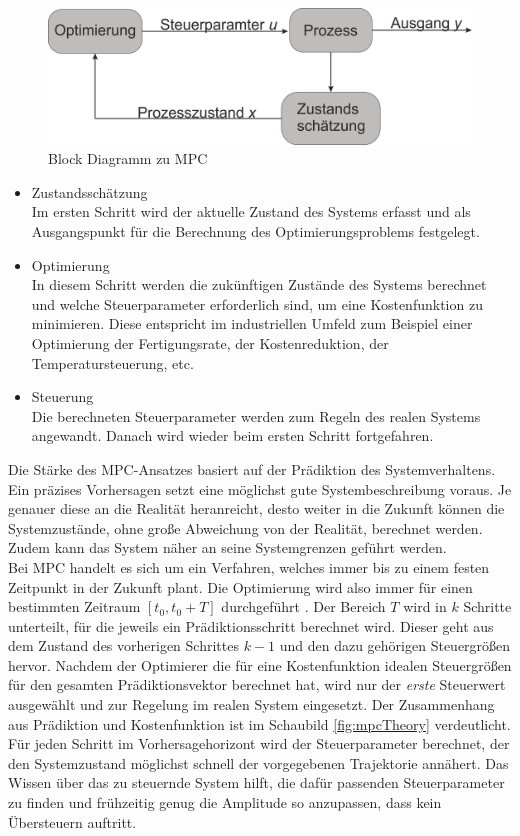 \documentclass{like}
\begin{document}
  \begin{figure}[ht!]
  	\centering
  	\includegraphics[width=350pt]{Abbildungen/mpcBlockDiagram.png}
  	\caption{Block Diagramm zu MPC}
  	\label{fig:mpcBlock}
  \end{figure}

\begin{itemize}
	\item Zustandsschätzung \\ Im ersten Schritt wird der aktuelle Zustand des Systems erfasst und als Ausgangspunkt für die Berechnung des Optimierungsproblems festgelegt.
	\item Optimierung \\ In diesem Schritt werden die zukünftigen Zustände des Systems berechnet und welche Steuerparameter erforderlich sind, um eine Kostenfunktion zu minimieren. Diese entspricht im industriellen Umfeld zum Beispiel einer Optimierung der Fertigungsrate, der Kostenreduktion,  der Temperatursteuerung, etc.
	\item Steuerung \\ Die berechneten Steuerparameter werden zum Regeln des realen Systems angewandt. Danach wird wieder beim ersten Schritt fortgefahren.   
\end{itemize}


Die Stärke des \ac{MPC}-Ansatzes basiert auf der Prädiktion des Systemverhaltens. Ein präzises Vorhersagen setzt eine möglichst gute Systembeschreibung voraus. Je genauer diese an die Realität heranreicht, desto weiter in die Zukunft können die Systemzustände, ohne große Abweichung von der Realität, berechnet werden. Zudem kann das System näher an seine Systemgrenzen geführt werden. \\
Bei \ac{MPC} handelt es sich um ein Verfahren, welches immer bis zu einem festen Zeitpunkt in der Zukunft plant. Die Optimierung wird also immer für einen bestimmten Zeitraum $ [t_0, t_0 + T] $ durchgeführt . Der Bereich \(T\) wird in \(k\) Schritte unterteilt, für die jeweils ein Prädiktionsschritt berechnet wird. Dieser geht aus dem Zustand des vorherigen Schrittes $k -1$ und den dazu gehörigen Steuergrößen hervor. Nachdem der Optimierer die für eine Kostenfunktion idealen Steuergrößen für den gesamten Prädiktionsvektor berechnet hat, wird nur der \emph{erste} Steuerwert ausgewählt und zur Regelung im realen System eingesetzt. Der Zusammenhang aus Prädiktion und Kostenfunktion ist im Schaubild \ref{fig:mpcTheory} verdeutlicht. Für jeden Schritt im Vorhersagehorizont wird der Steuerparameter berechnet, der den Systemzustand möglichst schnell der vorgegebenen Trajektorie annähert. Das Wissen über das zu steuernde System hilft, die dafür passenden Steuerparameter zu finden und frühzeitig genug die Amplitude so anzupassen, dass kein Übersteuern auftritt. 
\end{document}
